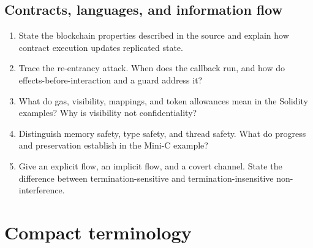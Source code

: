 \documentclass[11pt,a4paper]{article}
\newcommand{\currentmodule}{Contents}
\newcommand{\module}[2]{\par\Needspace{8\baselineskip}\gdef\currentmodule{#1}\section{#1}\label{#2}}
\numberwithin{figure}{section}
\begin{document}
\subsection{Contracts, languages, and information flow}
\begin{enumerate}[resume]
\item State the blockchain properties described in the source and explain how contract execution updates replicated state.
\item Trace the re-entrancy attack. When does the callback run, and how do effects-before-interaction and a guard address it?
\item What do gas, visibility, mappings, and token allowances mean in the Solidity examples? Why is visibility not confidentiality?
\item Distinguish memory safety, type safety, and thread safety. What do progress and preservation establish in the Mini-C example?
\item Give an explicit flow, an implicit flow, and a covert channel. State the difference between termination-sensitive and termination-insensitive non-interference.
\end{enumerate}
\module{Compact terminology}{sec:glossary}
\end{document}
